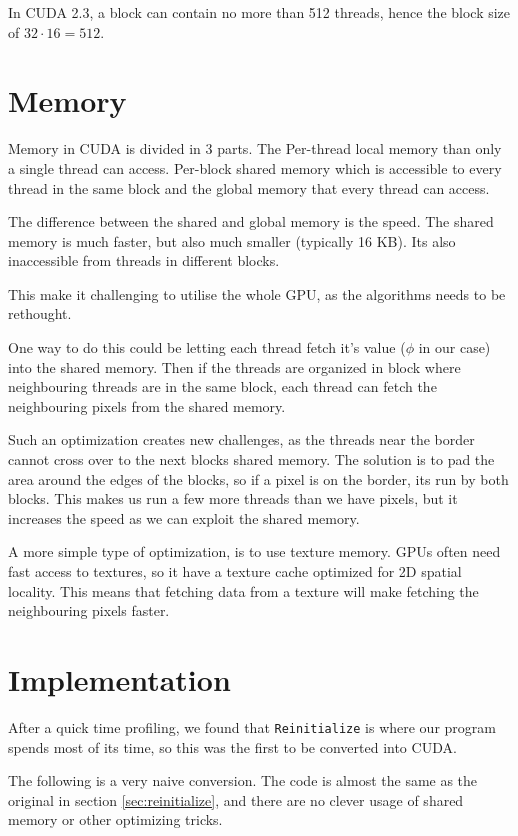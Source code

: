 In CUDA 2.3, a block can contain no more than 512 threads, hence the
block size of $32\cdot 16 = 512$.


\section{Memory}

Memory in CUDA is divided in 3 parts. The Per-thread local memory than
only a single thread can access. Per-block shared memory which is
accessible to every thread in the same block and the global
memory that every thread can access. 

The difference between the shared and global memory is the speed. The
shared memory is much faster, but also much smaller (typically 16
KB). Its also inaccessible from threads in different blocks.

This make it challenging to utilise the whole GPU, as the algorithms
needs to be rethought.

One way to do this could be letting each thread fetch it's value
($\phi$ in our case) into the shared memory. Then if the threads are
organized in block where neighbouring threads are in the same block,
each thread can fetch the neighbouring pixels from the shared memory.

Such an optimization creates new challenges, as the threads near the
border cannot cross over to the next blocks shared memory. The
solution is to pad the area around the edges of the blocks, so if a
pixel is on the border, its run by both blocks. This makes us run a
few more threads than we have pixels, but it increases the speed as we
can exploit the shared memory.

A more simple type of optimization, is to use texture memory. GPUs
often need fast access to textures, so it have a texture cache
optimized for 2D spatial locality. This means that fetching data from
a texture will make fetching the neighbouring pixels faster.

\section{Implementation}

After a quick time profiling, we found that \texttt{Reinitialize} is
where our program spends most of its time, so this was the first to be
converted into CUDA.

The following is a very naive conversion. The code is almost the same
as the original in section \ref{sec:reinitialize}, and there are no
clever usage of shared memory or other optimizing tricks.

